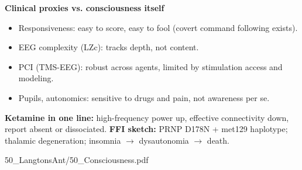 \begin{SideNotePage}{
  \textbf{Clinical proxies vs. consciousness itself} \par
  \begin{itemize}
    \item Responsiveness: easy to score, easy to fool (covert command following exists).
    \item EEG complexity (LZc): tracks depth, not content.
    \item PCI (TMS-EEG): robust across agents, limited by stimulation access and modeling.
    \item Pupils, autonomics: sensitive to drugs and pain, not awareness per se.
  \end{itemize}
  \vspace{0.5em}
  \textbf{Ketamine in one line:} high-frequency power up, effective connectivity down, report absent or dissociated.
  \vspace{0.5em}
  \textbf{FFI sketch:} PRNP D178N + met129 haplotype; thalamic degeneration; insomnia \(\to\) dysautonomia \(\to\) death.
}{50_LangtonsAnt/50_Consciousness.pdf}
\end{SideNotePage}

